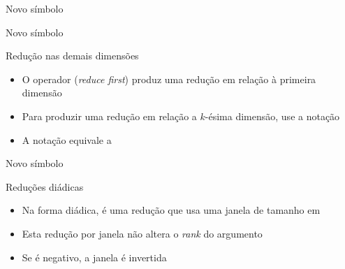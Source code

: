 \begin{frame}[fragile]{Novo símbolo}


\end{frame}

\begin{frame}[fragile]{Novo símbolo}


\end{frame}


\begin{frame}[fragile]{Redução nas demais dimensões}

    \begin{itemize}
        \item  O operador  (\textit{reduce first}) produz uma redução em relação à primeira dimensão
        
        \item Para produzir uma redução em relação a $k$-ésima dimensão, use a notação 

        \item A notação  equivale a 
    \end{itemize}

\end{frame}

\begin{frame}[fragile]{Novo símbolo}


\end{frame}

\begin{frame}[fragile]{Reduções diádicas}

    \begin{itemize}
        \item Na forma diádica,  é uma redução que usa uma janela de tamanho
             em 

        \item Esta redução por janela não altera o \textit{rank} do argumento

        \item Se  é negativo, a janela é invertida    
    \end{itemize}

\end{frame}

